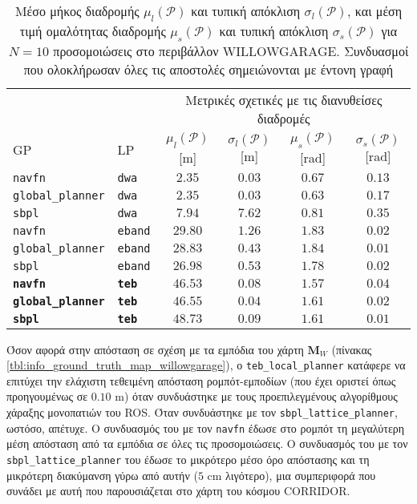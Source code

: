 \begin{table}[h]\centering
\renewcommand{\arraystretch}{1.3}
\begin{tabular}{llcccc}
  & & \multicolumn{4}{c}{Μετρικές σχετικές με τις διανυθείσες διαδρομές} \\
  \cline{3-6}
  GP & LP & $\mu_{l}(\bm{\mathcal{P}})$ [m] & $\sigma_{l}(\bm{\mathcal{P}})$ [m] & $\mu_{s}(\bm{\mathcal{P}})$ [rad] & $\sigma_{s}(\bm{\mathcal{P}})$ [rad] \\ \toprule
  \texttt{navfn} & \texttt{dwa} & $2.35$ & $0.03$ & $0.67$ & $0.13$ \\
  \texttt{global\_planner} & \texttt{dwa} & $2.35$ & $0.03$ & $0.63$ & $0.17$ \\
  \texttt{sbpl} & \texttt{dwa} & $7.94$ & $7.62$ & $0.81$ & $0.35$ \\
  \texttt{navfn} & \texttt{eband} & $29.80$ & $1.26$ & $1.83$ & $0.02$ \\
  \texttt{global\_planner} & \texttt{eband} & $28.83$ & $0.43$ & $1.84$ & $0.01$ \\
  \texttt{sbpl} & \texttt{eband} & $26.98$ & $0.53$ & $1.78$ & $0.02$ \\
  \textbf{\texttt{navfn}} & \textbf{\texttt{teb}} & $\bm{46.53}$ & $\bm{0.08}$ & $\bm{1.57}$ & $\bm{0.04}$ \\
  \textbf{\texttt{global\_planner}} & \textbf{\texttt{teb}} & $\bm{46.55}$ & $\bm{0.04}$ & $\bm{1.61}$ & $\bm{0.02}$ \\
  \textbf{\texttt{sbpl}} & \textbf{\texttt{teb}} & $\bm{48.73}$ & $\bm{0.09}$ & $\bm{1.61}$ & $\bm{0.01}$ \\ \bottomrule
\end{tabular}
\caption{\small Μέσο μήκος διαδρομής $\mu_{l}(\bm{\mathcal{P}})$ και τυπική
         απόκλιση $\sigma_{l}(\bm{\mathcal{P}})$, και μέση τιμή ομαλότητας
         διαδρομής $\mu_{s}(\bm{\mathcal{P}})$ και τυπική απόκλιση
         $\sigma_{s}(\bm{\mathcal{P}})$ για $N=10$ προσομοιώσεις στο περιβάλλον
         WILLOWGARAGE. Συνδυασμοί που ολοκλήρωσαν όλες τις αποστολές
         σημειώνονται με έντονη γραφή}
\label{tbl:info_ground_truth_willowgarage}
\end{table}

Όσον αφορά στην απόσταση σε σχέση με τα εμπόδια του χάρτη $\bm{M}_W$ (πίνακας
\ref{tbl:info_ground_truth_map_willowgarage}), ο \texttt{teb\_local\_planner}
κατάφερε να επιτύχει την ελάχιστη τεθειμένη απόσταση ρομπότ-εμποδίων
(που έχει οριστεί όπως προηγουμένως σε $0.10$ m) όταν συνδυάστηκε με τους
προεπιλεγμένους αλγορίθμους χάραξης μονοπατιών του ROS. Όταν συνδυάστηκε με τον
\texttt{sbpl\_lattice\_planner}, ωστόσο, απέτυχε. Ο συνδυασμός του με
τον \texttt{navfn} έδωσε στο ρομπότ τη μεγαλύτερη μέση απόσταση από τα εμπόδια
σε όλες τις προσομοιώσεις. Ο συνδυασμός του με τον
\texttt{sbpl\_lattice\_planner} του έδωσε το μικρότερο μέσο όρο απόστασης και
τη μικρότερη διακύμανση γύρω από αυτήν ($5$ cm λιγότερο), μια συμπεριφορά που
συνάδει με αυτή που παρουσιάζεται στο χάρτη του κόσμου CORRIDOR.

